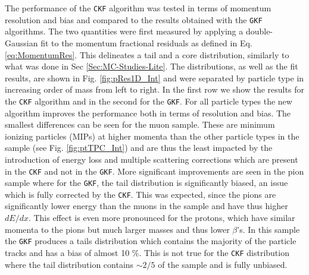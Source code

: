 The performance of the \texttt{CKF} algorithm was tested in terms of momentum resolution and bias and compared to the results obtained with the \texttt{GKF} algorithms. The two quantities were first measured by applying a double-Gaussian fit to the momentum fractional residuals as defined in Eq. \ref{eq:MomentumRes}. This delineates a tail and a core distribution, similarly to what was done in Sec \ref{Sec:MC-Studies-Lite}. The distributions, as well as the fit results, are shown in Fig. \ref{fig:pRes1D_Int} and were separated by particle type in increasing order of mass from left to right. In the first row we show the results for the \texttt{CKF} algorithm and in the second for the \texttt{GKF}. For all particle types the new algorithm improves the performance both in terms of resolution and bias. The smallest differences can be seen for the muon sample. These are minimum ionizing particles (MIPs) at higher momenta than the other particle types in the sample (see Fig. \ref{fig:ptTPC_Int}) and are thus the least impacted by the introduction of energy loss and multiple scattering corrections which are present in the \texttt{CKF} and not in the \texttt{GKF}. More significant improvements are seen in the pion sample where for the \texttt{GKF}, the tail distribution is significantly biased, an issue which is fully corrected by the \texttt{CKF}. This was expected, since the pions are significantly lower energy than the muons in the sample and have thus higher $dE/dx$. This effect is even more pronounced for the protons, which have similar momenta to the pions but much larger masses and thus lower $\beta$'s. In this sample the \texttt{GKF} produces a tails distribution which contains the majority of the particle tracks and has a bias of almost 10 \%. This is not true for the \texttt{CKF} distribution where the tail distribution contains $\sim2/5$ of the sample and is fully unbiased.


